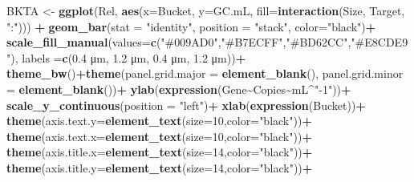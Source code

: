 \documentclass[
]{article}
\newenvironment{Shaded}{\begin{snugshade}}{\end{snugshade}}
\newcommand{\AttributeTok}[1]{\textcolor[rgb]{0.13,0.29,0.53}{#1}}
\newcommand{\DecValTok}[1]{\textcolor[rgb]{0.00,0.00,0.81}{#1}}
\newcommand{\FunctionTok}[1]{\textcolor[rgb]{0.13,0.29,0.53}{\textbf{#1}}}
\newcommand{\NormalTok}[1]{#1}
\newcommand{\OtherTok}[1]{\textcolor[rgb]{0.56,0.35,0.01}{#1}}
\newcommand{\SpecialCharTok}[1]{\textcolor[rgb]{0.81,0.36,0.00}{\textbf{#1}}}
\newcommand{\StringTok}[1]{\textcolor[rgb]{0.31,0.60,0.02}{#1}}
\begin{document}
\begin{Shaded}
\begin{Highlighting}[]
\NormalTok{BKTA }\OtherTok{\textless{}{-}} \FunctionTok{ggplot}\NormalTok{(Rel, }\FunctionTok{aes}\NormalTok{(}\AttributeTok{x=}\NormalTok{Bucket, }\AttributeTok{y=}\NormalTok{GC.mL, }\AttributeTok{fill=}\FunctionTok{interaction}\NormalTok{(Size, Target, }\StringTok{":"}\NormalTok{))) }\SpecialCharTok{+} 
  \FunctionTok{geom\_bar}\NormalTok{(}\AttributeTok{stat =} \StringTok{"identity"}\NormalTok{, }\AttributeTok{position =} \StringTok{"stack"}\NormalTok{, }\AttributeTok{color=}\StringTok{"black"}\NormalTok{)}\SpecialCharTok{+}
  \FunctionTok{scale\_fill\_manual}\NormalTok{(}\AttributeTok{values=}\FunctionTok{c}\NormalTok{(}\StringTok{"\#009AD0"}\NormalTok{,}\StringTok{"\#B7ECFF"}\NormalTok{,}\StringTok{"\#BD62CC"}\NormalTok{,}\StringTok{"\#E8CDE9"}\NormalTok{), }\AttributeTok{labels =}\FunctionTok{c}\NormalTok{(}\StringTok{\textquotesingle{}0.4 μm\textquotesingle{}}\NormalTok{, }\StringTok{\textquotesingle{}1.2 μm\textquotesingle{}}\NormalTok{, }\StringTok{\textquotesingle{}0.4 μm\textquotesingle{}}\NormalTok{, }\StringTok{\textquotesingle{}1.2 μm\textquotesingle{}}\NormalTok{))}\SpecialCharTok{+}
  \FunctionTok{theme\_bw}\NormalTok{()}\SpecialCharTok{+}\FunctionTok{theme}\NormalTok{(}\AttributeTok{panel.grid.major =} \FunctionTok{element\_blank}\NormalTok{(), }\AttributeTok{panel.grid.minor =} \FunctionTok{element\_blank}\NormalTok{())}\SpecialCharTok{+}
  \FunctionTok{ylab}\NormalTok{(}\FunctionTok{expression}\NormalTok{(Gene}\SpecialCharTok{\textasciitilde{}}\NormalTok{Copies}\SpecialCharTok{\textasciitilde{}}\NormalTok{mL}\SpecialCharTok{\^{}}\StringTok{"{-}1"}\NormalTok{))}\SpecialCharTok{+}
  \FunctionTok{scale\_y\_continuous}\NormalTok{(}\AttributeTok{position =} \StringTok{"left"}\NormalTok{)}\SpecialCharTok{+}
  \FunctionTok{xlab}\NormalTok{(}\FunctionTok{expression}\NormalTok{(Bucket))}\SpecialCharTok{+}
  \FunctionTok{theme}\NormalTok{(}\AttributeTok{axis.text.y=}\FunctionTok{element\_text}\NormalTok{(}\AttributeTok{size=}\DecValTok{10}\NormalTok{,}\AttributeTok{color=}\StringTok{"black"}\NormalTok{))}\SpecialCharTok{+}
  \FunctionTok{theme}\NormalTok{(}\AttributeTok{axis.text.x=}\FunctionTok{element\_text}\NormalTok{(}\AttributeTok{size=}\DecValTok{10}\NormalTok{,}\AttributeTok{color=}\StringTok{"black"}\NormalTok{))}\SpecialCharTok{+}
  \FunctionTok{theme}\NormalTok{(}\AttributeTok{axis.title.x=}\FunctionTok{element\_text}\NormalTok{(}\AttributeTok{size=}\DecValTok{14}\NormalTok{,}\AttributeTok{color=}\StringTok{"black"}\NormalTok{))}\SpecialCharTok{+}
  \FunctionTok{theme}\NormalTok{(}\AttributeTok{axis.title.y=}\FunctionTok{element\_text}\NormalTok{(}\AttributeTok{size=}\DecValTok{14}\NormalTok{,}\AttributeTok{color=}\StringTok{"black"}\NormalTok{))}\SpecialCharTok{+}

\end{Highlighting}
\end{Shaded}
\end{document}

